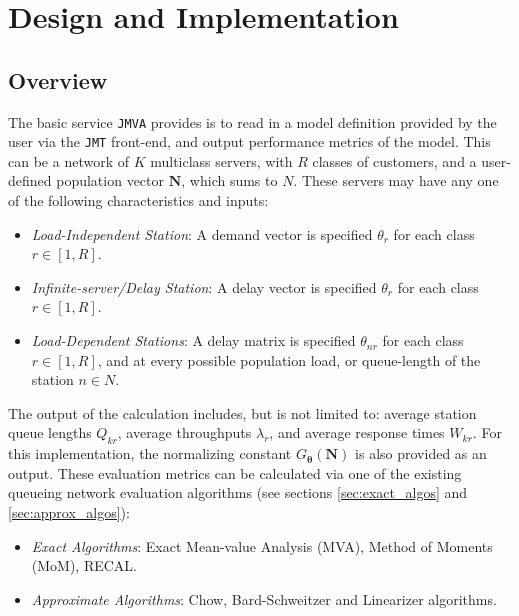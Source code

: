 \chapter{Design and Implementation} \label{chap:DesignImplementation}

\section{Overview}\label{sec:Overview}
The basic service \texttt{JMVA} provides is to read in a model definition provided by the user via the \texttt{JMT} front-end, and output performance metrics of the model. This can be a network of \(K\) multiclass servers, with \(R\) classes of customers, and a user-defined population vector \(\mathbf{N}\), which sums to \(N\). These servers may have any one of the following characteristics and inputs:
\begin{itemize}[noitemsep]
    \item \textit{Load-Independent Station}: A demand vector is specified \(\theta_r\) for each class \(r \in [1,R]\).
    \item \textit{Infinite-server/Delay Station}: A delay vector is specified \(\theta_r\) for each class \(r \in [1,R]\).
    \item \textit{Load-Dependent Stations}: A delay matrix is specified \(\theta_{nr}\) for each class \(r \in [1,R]\), and at every possible population load, or queue-length of the station \(n \in N\).
\end{itemize}

The output of the calculation includes, but is not limited to: average station queue lengths \(Q_{kr}\), average throughputs \(\lambda_{r}\), and average response times \(W_{kr}\). For this implementation, the normalizing constant \(G_{\boldsymbol{\theta}}(\mathbf{N})\) is also provided as an output. These evaluation metrics can be calculated via one of the existing queueing network evaluation algorithms (see sections \ref{sec:exact_algos} and \ref{sec:approx_algos}):
\begin{itemize}[noitemsep]
    \item \textit{Exact Algorithms}: Exact Mean-value Analysis (MVA), Method of Moments (MoM), RECAL.
    \item \textit{Approximate Algorithms}: Chow, Bard-Schweitzer and Linearizer algorithms.
\end{itemize}

